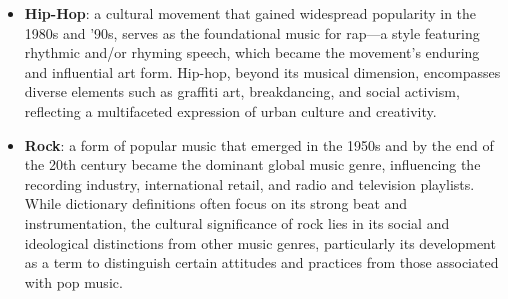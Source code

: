 \begin{itemize}
    \item \textbf{Hip-Hop}: a cultural movement that gained widespread popularity in the 1980s and '90s, serves as the foundational music for rap—a style featuring rhythmic and/or rhyming speech, which became the movement's enduring and influential art form. 
    Hip-hop, beyond its musical dimension, encompasses diverse elements such as graffiti art, breakdancing, and social activism, reflecting a multifaceted expression of urban culture and creativity. \citep{tate_2019_hiphop} \nocite{seanmccollum_2019_hiphop}
    \item \textbf{Rock}: a form of popular music that emerged in the 1950s and by the end of the 20th century became the dominant global music genre, influencing the recording industry, international retail, and radio and television playlists. 
    While dictionary definitions often focus on its strong beat and instrumentation, the cultural significance of rock lies in its social and ideological distinctions from other music genres, particularly its development as a term to distinguish certain attitudes and practices from those associated with pop music.\citep{frith_2018_rock}
\end{itemize}

